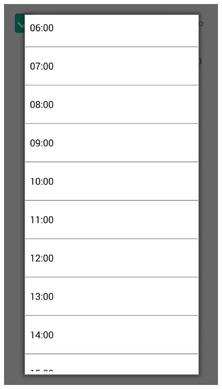 \begin{figure}[h!]
{      \includegraphics[keepaspectratio=true, scale=0.2]{figuras/mob28.png}
   }
    
\end{figure}

